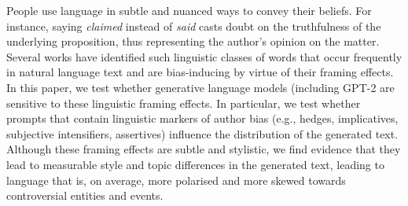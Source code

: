 People use language in subtle and nuanced ways to convey their beliefs. For instance, saying \textit{claimed} instead of \textit{said} casts doubt on the truthfulness of the underlying proposition, thus representing the author's opinion on the matter. Several works have identified such linguistic classes of words that occur frequently in natural language text and are bias-inducing by virtue of their framing effects. In this paper, we test whether generative language models (including GPT-2 \cite{radford2019language} are sensitive to these linguistic framing effects. In particular, we test whether prompts that contain linguistic markers of author bias (e.g., hedges, implicatives, subjective intensifiers, assertives) influence the distribution of the generated text. Although these framing effects are subtle and stylistic, we find evidence that they lead to measurable style and topic differences in the generated text, leading to language that is, on average, more polarised and more skewed towards controversial entities and events.
